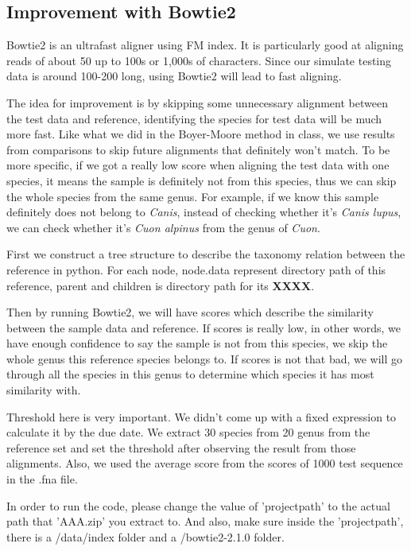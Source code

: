 \documentclass[12pt]{article} %
\begin{document}
\subsection{Improvement with Bowtie2}
Bowtie2 is an ultrafast aligner using FM index. It is particularly good at aligning reads of about 50 up to 100s or 1,000s of characters. Since our simulate testing data is around 100-200 long, using Bowtie2 will lead to fast aligning.
\par
The idea for improvement is by skipping some unnecessary alignment between the test data and reference, identifying the species for test data will be much more fast. Like what we did in the Boyer-Moore method in class, we use results from comparisons to skip future alignments that definitely won't match. To be more specific,  if we got a really low score when aligning the test data with one species, it means the sample is definitely not from this species, thus we can skip the whole species from the same genus. For example, if we know this sample definitely does not belong to \emph{Canis}, instead of checking whether it's \emph{Canis lupus}, we can check whether it's \emph{Cuon alpinus} from the genus of \emph{Cuon}.
\par
First we construct a tree structure to describe the taxonomy relation between the reference in python. For each node, node.data represent directory path of this reference, parent and children is directory path for its {\bf XXXX}. 
\par
Then by running Bowtie2, we will have scores which describe the similarity between the sample data and reference. If scores is really low, in other words, we have enough confidence to say the sample is not from this species, we skip the whole genus this reference species belongs to. If scores is not that bad, we will go through all the species in this genus to determine which species it has most similarity with.  
\par
Threshold here is very important. We didn't come up with a fixed expression to calculate it by the due date. We extract 30 species from 20 genus from the reference set and set the threshold after observing the result from those alignments. Also, we used the average score from the scores of 1000 test sequence in the .fna file.
\par
In order to run the code, please change the value of 'projectpath' to the actual path that 'AAA.zip' you extract to. And also, make sure inside the 'projectpath', there is a /data/index folder and a /bowtie2-2.1.0 folder.
\end{document}
